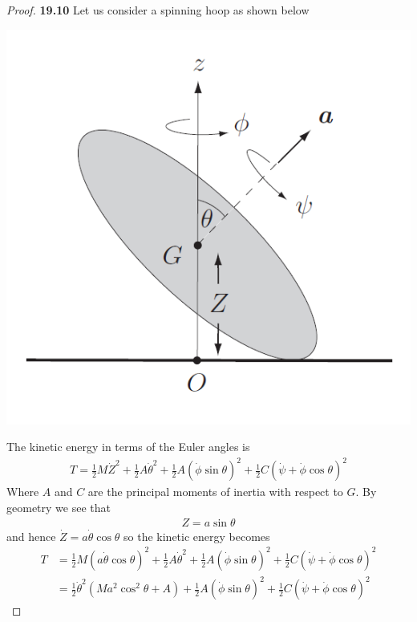 \documentclass[11pt]{article}
\theoremstyle{definition}
\begin{document}
\cleardoublepage
\begin{proof}{\textbf{19.10}}
    Let us consider a spinning hoop as shown below
    \begin{center}
        \includegraphics[scale=0.45]{ch19-10.png}
    \end{center}
    The kinetic energy in terms of the Euler angles is
    \begin{align*}
        T = \frac{1}{2}M\dot Z^2 + \frac{1}{2}A\dot\theta^2
        + \frac{1}{2}A(\dot\phi\sin\theta)^2
        + \frac{1}{2}C(\dot\psi + \dot\phi\cos\theta)^2
    \end{align*}
    Where $A$ and $C$ are the principal moments of inertia with respect to $G$.
    By geometry we see that
    \begin{align*}
        Z = a \sin\theta
    \end{align*}
    and hence $\dot Z = a\dot\theta \cos\theta$ so the kinetic energy becomes
    \begin{align*}
        T &= \frac{1}{2}M(a\dot\theta \cos\theta)^2
        + \frac{1}{2}A\dot\theta^2
        + \frac{1}{2}A(\dot\phi\sin\theta)^2
        + \frac{1}{2}C(\dot\psi + \dot\phi\cos\theta)^2\\
        &= \frac{1}{2}\dot\theta^2 (Ma^2\cos^2\theta + A)
        + \frac{1}{2}A(\dot\phi\sin\theta)^2
        + \frac{1}{2}C(\dot\psi + \dot\phi\cos\theta)^2

\end{align*}
\end{proof}
\end{document}
